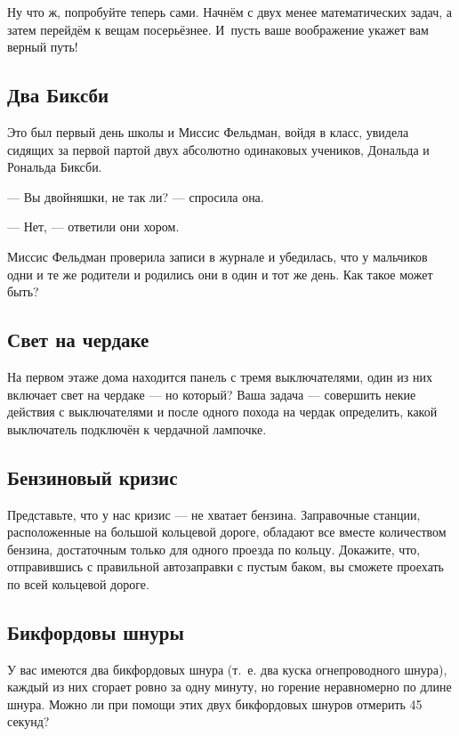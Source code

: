 \medskip

Ну что ж, попробуйте теперь сами.
Начнём с двух менее математических задач, а затем перейдём к вещам посерьёзнее.
И~пусть ваше воображение укажет вам верный путь!

\subsection*{Два Биксби} %

Это был первый день школы и Миссис Фельдман, войдя в класс, увидела сидящих за первой партой двух абсолютно одинаковых учеников, Дональда и Рональда Биксби.

--- Вы двойняшки, не так ли? --- спросила она.

--- Нет, --- ответили они хором.

Миссис Фельдман проверила записи в журнале и убедилась, что у мальчиков одни и те же родители и родились они в один и тот же день.
Как такое может быть?

\subsection*{Свет на чердаке} %

На первом этаже дома находится панель с тремя выключателями, один из них включает свет на чердаке --- но который? 
Ваша задача --- совершить некие действия с выключателями и после одного похода на чердак определить, какой выключатель подключён к чердачной лампочке.

\subsection*{Бензиновый кризис} %

Представьте, что у нас кризис --- не хватает бензина.
Заправочные станции, расположенные на большой кольцевой дороге, обладают все вместе количеством бензина, достаточным только для одного проезда по кольцу.
Докажите, что, отправившись с правильной автозаправки с пустым баком, вы сможете проехать по всей кольцевой дороге.

\subsection*{Бикфордовы шнуры} %

У вас имеются два бикфордовых шнура (т.~е. два куска огнепроводного шнура), каждый из них сгорает ровно за одну минуту, но горение неравномерно по длине шнура.
Можно ли при помощи этих двух бикфордовых шнуров отмерить 45 секунд?

